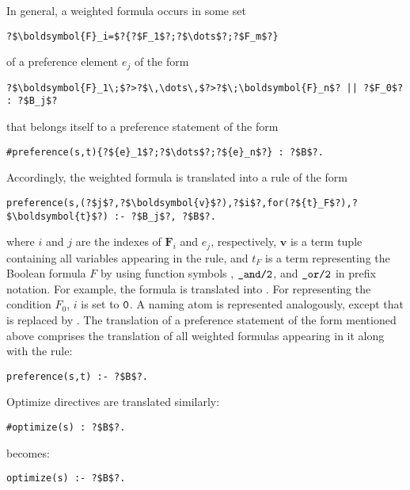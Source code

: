 In general, a weighted formula 
occurs in some set
\begin{lstlisting}[numbers=none,escapechar=?]
?$\boldsymbol{F}_i=$?{?$F_1$?;?$\dots$?;?$F_m$?}
\end{lstlisting}
of a preference element $e_j$ of the form 
\begin{lstlisting}[numbers=none,escapechar=?]
?$\boldsymbol{F}_1\;$?>?$\,\dots\,$?>?$\;\boldsymbol{F}_n$? || ?$F_0$? : ?$B_j$?
\end{lstlisting}
that belongs itself to a preference statement  of the form
\begin{lstlisting}[numbers=none,escapechar=?]
#preference(s,t){?${e}_1$?;?$\dots$?;?${e}_n$?} : ?$B$?.
\end{lstlisting}
Accordingly, the weighted formula is translated into a rule of the form
\begin{lstlisting}[numbers=none,escapechar=?]
preference(s,(?$j$?,?$\boldsymbol{v}$?),?$i$?,for(?${t}_F$?),?$\boldsymbol{t}$?) :- ?$B_j$?, ?$B$?.
\end{lstlisting}
where $i$ and $j$ are the indexes of $\boldsymbol{F}_i$ and $e_j$, respectively, 
$\boldsymbol{v}$ is a term tuple containing all variables appearing in the rule, 
and ${t}_F$ is a term representing the Boolean formula $F$ 
by using function symbols , $\texttt{\_and/2}$, and $\texttt{\_or/2}$ in prefix notation.
For example, 
the formula  is translated into . 
%
For representing the condition $F_0$, $i$ is set to $\texttt{0}$.
%
A naming atom  is represented analogously,
except that  is replaced by .
%
The translation of a preference statement of the form mentioned above 
comprises the translation of all weighted formulas appearing in it
along with the rule:
\begin{lstlisting}[numbers=none,escapechar=?]
preference(s,t) :- ?$B$?.
\end{lstlisting}
Optimize directives are translated similarly:
\begin{lstlisting}[numbers=none,escapechar=?]
#optimize(s) : ?$B$?.
\end{lstlisting}
becomes:
\begin{lstlisting}[numbers=none,escapechar=?]
optimize(s) :- ?$B$?.
\end{lstlisting}

